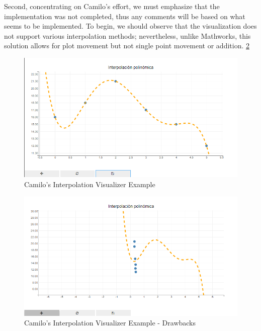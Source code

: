 Second, concentrating on Camilo's effort, we must emphasize that the implementation was not completed, thus any comments will be based on what seems to be implemented. To begin, we should observe that the visualization does not support various interpolation methods; nevertheless, unlike Mathworks, this solution allows for plot movement but not single point movement or addition. \ref{fig:Camilo's Interpolation Visualizer Example - Drawbacks}

\begin{figure}[H]
    \centering
    \includegraphics[width=\textwidth]{Include/Images/Thesis/Development/Visualizers/INTERPOLATION VISUALIZER/Camilo.Interpolation.Ex1.png}
    \caption{Camilo's Interpolation Visualizer Example}
    \label{fig:Camilo's Interpolation Visualizer Example}
\end{figure}

\begin{figure}[H]
    \centering
    \includegraphics[width=\textwidth]{Include/Images/Thesis/Development/Visualizers/INTERPOLATION VISUALIZER/Camilo.Interpolation.Ex1.1.png}
    \caption{Camilo's Interpolation Visualizer Example - Drawbacks}
    \label{fig:Camilo's Interpolation Visualizer Example - Drawbacks}
\end{figure}


